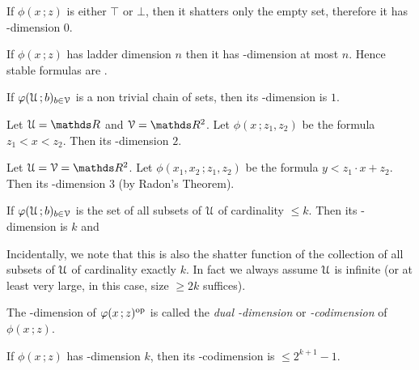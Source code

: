 \documentclass[scombinatorics.tex]{subfiles}
\begin{document}
\begin{example}
  If $\phi(x\,;z)$ is either $\top$ or $\bot$, then it shatters only the empty set, therefore it has \vc-dimension $0$.\QED
\end{example}

\begin{example}
  If $\phi(x\,;z)$ has ladder dimension $n$ then it has \vc-dimension at most $n$. Hence stable formulas are \nip.\QED
\end{example}
 
\begin{example}
  If $\phi(\U\,;b)_{b\in\V}$ is a non trivial chain of sets, then its \vc-dimension is $1$.\QED
\end{example}
 
\begin{example} 
  Let $\U=\RR$ and $\V=\RR^2$.
  Let $\phi(x\,;z_1,z_2)$ be the formula $z_1<x<z_2$.
  Then its \vc-dimension $2$.\QED
\end{example}
 
\begin{example} 
  Let $\U=\V=\RR^2$.
  Let $\phi(x_1,x_2\,;z_1,z_2)$ be the formula $y<z_1\cdot x + z_2$.
  Then its  \vc-dimension $3$ (by Radon's Theorem).\QED
\end{example}
 
\begin{example}\label{ex_vcdim_opt}
  If $\phi(\U\,;b)_{b\in\V}$ is the set of all subsets of $\U$ of cardinality $\le k$.
  Then its \vc-dimension is $k$ and
  
  
  Incidentally, we note that this is also the shatter function of the collection of all subsets of $\U$ of cardinality exactly $k$.
  In fact we always assume $\U$ is infinite (or at least very large, in this case, size $\ge2k$ suffices).\QED
\end{example}

The \vc-dimension of $\phi(x\,;z)^{\rm op}$ is called the \emph{dual \vc-dimension\/} or \emph{\vc-codimension\/} of $\phi(x\,;z)$.

\begin{proposition}\label{prop_bound_VCcodim}
  If $\phi(x\,;z)$ has \vc-dimension $k$, then its \vc-codimension is $\le2^{k+1}-1$.
\end{proposition}
  
\end{document}
